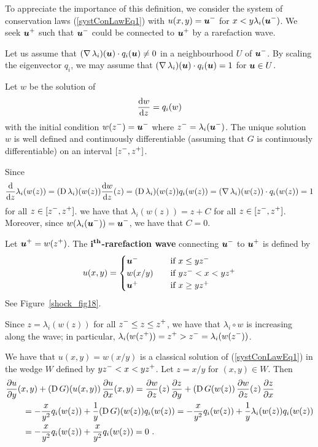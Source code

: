 \begin{egg}
To appreciate the importance of this definition,     \label{eggRareWaveN}
we consider the system of conservation laws
(\ref{systConLawEq1}) with $\DS u(x,y) = \VEC{u}^-$
for $\DS x < y \lambda_i(\VEC{u}^-)$.  We seek
$\DS \VEC{u}^+$ such that $\DS \VEC{u}^-$
could be connected to $\DS \VEC{u}^+$ by
a rarefaction wave.

Let us assume that $(\graD \lambda_i)(\VEC{u}) \cdot q_i(\VEC{u}) \neq 0$
in a neighbourhood $U$ of $\DS \VEC{u}^-$.  By scaling the
eigenvector $q_i$, we may assume that
$(\graD \lambda_i)(\VEC{u}) \cdot q_i(\VEC{u}) = 1$
for $\VEC{u} \in U$.

Let $w$ be the solution of
\[
\dydx{w}{z} = q_i(w)
\]
with the initial condition $\DS w(z^-) = \VEC{u}^-$
where $\DS z^- = \lambda_i(\VEC{u}^-)$.  The unique solution
$w$ is well defined and continuously differentiable (assuming that $G$
is continuously differentiable) on an interval $\DS [z^-,z^+]$.

Since
\[
\dfdx{\lambda_i(w(z))}{z}  
= (\diff \lambda_i)(w(z)) \dydx{w}{z}(z)
= (\diff \lambda_i)(w(z)) q_i(w(z))
= (\graD \lambda_i)(w(z))\cdot q_i(w(z)) = 1
\]
for all $\DS z \in [z^-,z^+]$. we have that
$\lambda_i(w(z)) = z + C$ for all $\DS z \in [z^-,z^+]$.
Moreover, since $\DS w(\lambda_i(\VEC{u}^-)) = \VEC{u}^-$,
we have that $C=0$.

Let $\DS \VEC{u}^+ = w(z^+)$.
The {\bfseries $\DS \mathbf{i^{th}}$-rarefaction
wave}
connecting $\DS \VEC{u}^-$ to $\DS \VEC{u}^+$
is defined by
\[
u(x,y) = \begin{cases}
\VEC{u}^- & \quad \text{if} \ x \leq y z^- \\
w(x/y) & \quad \text{if} \ y z^- < x < y z^+ \\
\VEC{u}^+ & \quad \text{if} \ x \geq y z^+
\end{cases}
\]
See Figure~\ref{shock_fig18}.

Since $z = \lambda_i(w(z))$ for all $\DS z^- \leq z \leq z^+$,
we have that $\lambda_i\circ w$ is increasing along the wave; in
particular, $\DS \lambda_i(w(z^+)) = z^+ > z^- = \lambda_i(w(z^-))$.

We have that $u(x,y) = w(x/y)$ is a classical solution of
(\ref{systConLawEq1}) in the wedge $W$ defined by
$\DS y z^- < x < y z^+$.  Let $z = x/y$ for $(x,y) \in W$.  Then
\begin{align*}
&\pdydx{u}{y}(x,y) + (\diff G)(u(x,y)) \, \pdydx{u}{x}(x,y)
= \pdydx{w}{z}(z)\,\pdydx{z}{y} + (\diff G(w(z)) \, \pdydx{w}{z}(z)\,
\pdydx{z}{x} \\
&\qquad = -\frac{x}{y^2} q_i(w(z)) + \frac{1}{y} (\diff G)(w(z)) q_i(w(z))
= -\frac{x}{y^2} q_i(w(z)) + \frac{1}{y} \lambda_i(w(z)) q_i(w(z)) \\
&\qquad = -\frac{x}{y^2} q_i(w(z)) + \frac{x}{y^2} q_i(w(z))
= 0 \ .
\end{align*}
\end{egg}

